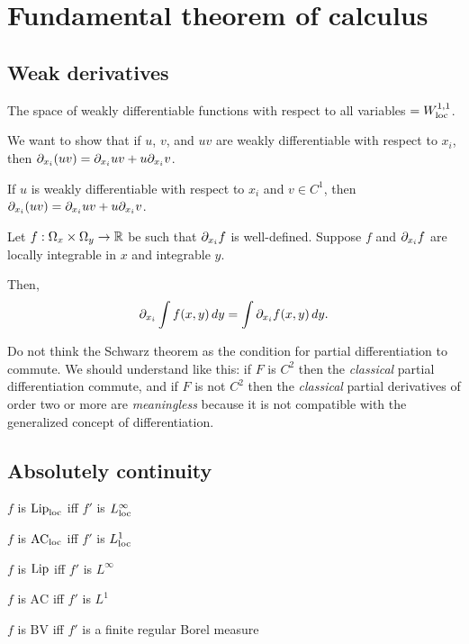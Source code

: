 \documentclass{../../large}
\begin{document}
\part{Fundamental theorem of calculus}

\chapter{Weak derivatives}

The space of weakly differentiable functions with respect to all variables $=W_{\mathrm{loc}}^{1,1}$.

\begin{prb}
We want to show that if $u$, $v$, and $uv$ are weakly differentiable with respect to $x_i$, then $\pd_{x_i}(uv)=\pd_{x_i}uv+u\pd_{x_i}v$.
\begin{parts}
\item If $u$ is weakly differentiable with respect to $x_i$ and $v\in C^1$, then $\pd_{x_i}(uv)=\pd_{x_i}uv+u\pd_{x_i}v$.
\end{parts}
\end{prb}


\begin{prb}
Let $f:\Omega_x\times\Omega_y\to\mathbb{R}$ be such that $\pd_{x_i}f$ is well-defined. Suppose $f$ and $\pd_{x_i}f$ are locally integrable in $x$ and integrable $y$.

Then,
\[\pd_{x_i}\int f(x,y)\,dy=\int\pd_{x_i}f(x,y)\,dy.\]
\end{prb}


Do not think the Schwarz theorem as the condition for partial differentiation to commute.
We should understand like this: if $F$ is $C^2$ then the \emph{classical} partial differentiation commute, and if $F$ is not $C^2$ then the \emph{classical} partial derivatives of order two or more are \emph{meaningless} because it is not compatible with the generalized concept of differentiation.



\chapter{Absolutely continuity}

\begin{parts}
\item $f$ is $\operatorname{Lip}_{\mathrm{loc}}$ iff $f'$ is $L_{\mathrm{loc}}^\infty$
\item $f$ is $\textrm{AC}_{\mathrm{loc}}$ iff $f'$ is $L_{\mathrm{loc}}^1$
\end{parts}
\begin{parts}
\item $f$ is $\operatorname{Lip}$ iff $f'$ is $L^\infty$
\item $f$ is $\textrm{AC}$ iff $f'$ is $L^1$
\item $f$ is $\textrm{BV}$ iff $f'$ is a finite regular Borel measure
\end{parts}
\end{document}
